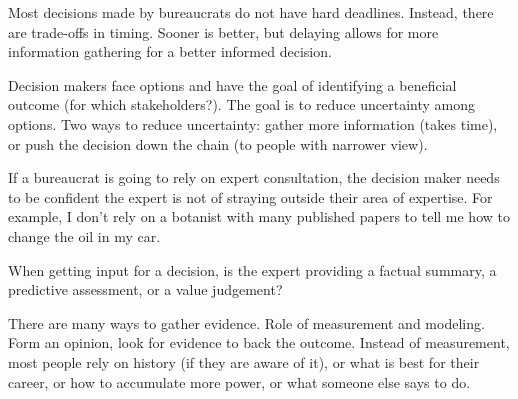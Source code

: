 Most decisions made by bureaucrats do not have hard deadlines. Instead, there are trade-offs in timing. Sooner is better, but delaying allows for more information gathering for a better informed decision.




Decision makers face options and have the goal of identifying a beneficial outcome (for which stakeholders?). The goal is to reduce uncertainty among options. Two ways to reduce uncertainty: gather more information (takes time), or push the decision down the chain (to people with narrower view). 

If a bureaucrat is going to rely on expert consultation, the decision maker needs to be confident the expert is not of straying outside their area of expertise. For example, I don't rely on a botanist with many published papers to tell me how to change the oil in my car. 

When getting input for a decision, is the expert providing a factual summary, a predictive assessment, or a value judgement? 

There are many ways to gather evidence. 
Role of measurement and modeling. 
Form an opinion, look for evidence to back the outcome.
Instead of measurement, most people rely on history (if they are aware of it), or what is best for their career, or how to accumulate more power, or what someone else says to do.  
